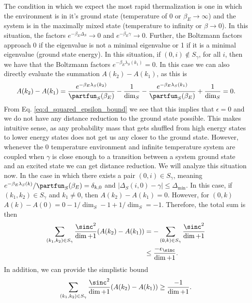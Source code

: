     The condition in which we expect the most rapid thermalization is one in which the environment is in it's ground state (temperature of 0 or $\beta_E \to \infty$) and the system is in the maximally mixed state (temperature to infinity or $\beta \to 0$). In this situation, the factors $e^{-\beta_E \Delta_S} \to 0$ and $e^{-\beta_E \gamma} \to 0$. Further, the Boltzmann factors approach 0 if the eigenvalue is not a minimal eigenvalue or 1 if it is a minimal eigenvalue (ground state energy). In this situation, if $(0, i) \notin S_{\gamma}$, for all $i$, then we have that the Boltzmann factors $e^{-\beta_E \lambda_S(k_1)} = 0$. In this case we can also directly evaluate the summation $A(k_2) - A(k_1)$, as this is 
    \begin{equation}
        A(k_2) - A(k_1) = \frac{e^{-\beta_E \lambda_S(k_2)}}{\partfun_S(\beta_E)} - \frac{1}{\dim_S} - \frac{e^{-\beta_E \lambda_S(k_1)}}{\partfun_S(\beta_E)} + \frac{1}{\dim_S} = 0.
    \end{equation}
    From Eq. \eqref{eq:d_squared_epsilon_bound} we see that this implies that $\epsilon = 0$ and we do not have any distance reduction to the ground state possible. This makes intuitive sense, as any probability mass that gets shuffled from high energy states to lower energy states does not get us any closer to the ground state. 
    However, whenever the 0 temperature environment and infinite temperature system are coupled when $\gamma$ is close enough to a transition between a system ground state and an excited state we can get distance reduction. We will analyze this situation now. In the case in which there exists a pair $(0, i) \in S_{\gamma}$, meaning $e^{-\beta_E \lambda_S(k)} / \partfun_S(\beta_E) = \delta_{k,0}$ and $|\Delta_S(i, 0) - \gamma| \leq \Delta_{\min}$. In this case, if $(k_1, k_2) \in S_{\gamma}$ and $k_1 \neq 0$, then $A(k_2) - A(k_1) = 0$. However, for $(0, k)$ $A(k) - A(0) = 0 - 1/\dim_S - 1 + 1/\dim_S = -1$. Therefore, the total sum is then 
    \begin{align}
        \sum_{(k_1, k_2) \in S_{\gamma}} \frac{\sinc^2}{\dim + 1} (A(k_2) - A(k_1)) &= - \sum_{(0, k) \in S_{\gamma}} \frac{\sinc^2}{\dim + 1} \\
        &\leq \frac{- \epsilon_{\sinc}}{\dim + 1}.
    \end{align}
    In addition, we can provide the simplistic bound 
    \begin{equation}
        \sum_{(k_1, k_2) \in S_{\gamma}} \frac{\sinc^2}{\dim + 1}(A(k_2) - A(k_1)) \geq \frac{-1}{\dim + 1}.
    \end{equation}
